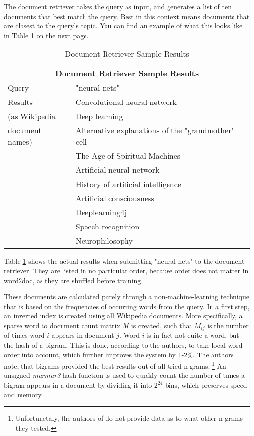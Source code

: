 The document retriever takes the query as input, and generates a list of ten documents that best match the query. Best in this
context means documents that are closest to the query's topic. You can find an example of what this looks like in Table
\ref{tbl:doc-ret} on the next page.

\begin{table}
  \centering
  \begin{tabular}{|p{3cm}|p{7cm}|}
    \hline
    \multicolumn{2}{|c|}{Document Retriever Sample Results} \\
    \hline
    Query&"neural nets"\\
    \hline
    Results&Convolutional neural network\\
    (as Wikipedia&Deep learning\\
    document names)&Alternative explanations of the "grandmother" cell\\
    &The Age of Spiritual Machines\\
    &Artificial neural network\\
    &History of artificial intelligence \\
    &Artificial consciousness\\
    &Deeplearning4j\\
    &Speech recognition\\
    &Neurophilosophy\\
    \hline
  \end{tabular}
  \caption{Document Retriever Sample Results}
  \label{tbl:doc-ret}
\end{table}

Table \ref{tbl:doc-ret} shows the actual results when submitting "neural nets" to the document retriever.
They are listed in no particular order, because order does not matter in word2doc, as they are shuffled
before training.

These documents are calculated purely through a non-machine-learning technique that is based on the frequencies of occurring words
from the query. In a first step, an inverted index is created using all Wikipedia documents. More specifically, a sparse word to
document count matrix $M$ is created, such that $M_{ij}$ is the number of times word $i$ appears in document $j$. Word $i$ is in
fact not quite a word, but the hash of a bigram. This is done, according to the authors, to take local word order into account,
which further improves the system by 1-2\%. The authors note, that bigrams provided the best results out of all tried n-grams.
\footnote{Unfortunetaly, the authors of \citet{drqa} do not provide data as to what other n-grams they tested.}
An unsigned \textit{murmur3} hash function \citep{weinberger2009} is used to quickly count the number of times a
bigram appears in a document by dividing it into $2^{24}$ bins, which preserves speed and memory.

